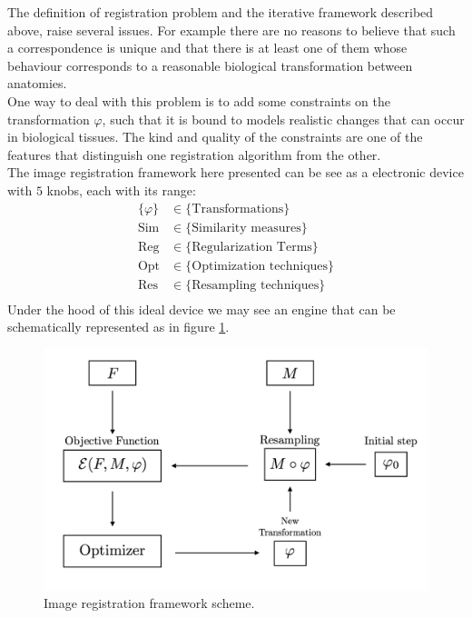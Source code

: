 The definition of registration problem and the iterative framework described above, raise several issues. For example there are no reasons to believe that such a correspondence is unique and that there is at least one of them whose behaviour corresponds to a reasonable biological transformation between anatomies.\\ 

One way to deal with this problem is to add some constraints on the transformation $\varphi$, such that it is bound to models realistic changes that can occur in biological tissues. The kind and quality of the constraints are one of the features that distinguish one registration algorithm from the other. \\
The image registration framework here presented can be see as a electronic device with $5$ knobs, each with its range:
\begin{align*}
\{  \varphi \} &\in \{ \text{Transformations}\}\\
\text{Sim} &\in \{ \text{Similarity measures}\}\\
\text{Reg} &\in \{ \text{Regularization Terms}\}\\
\text{Opt} &\in \{ \text{Optimization techniques}\}\\
\text{Res} &\in \{ \text{Resampling techniques}\}\\
\end{align*}
Under the hood of this ideal device we may see an engine that can be schematically represented as in figure \ref{fig:iterative_algorithm_scheme}.
\begin{figure}[!ht]
	\centering
	\includegraphics[scale=0.235]{figures/iterative_algorithm.png}
	\caption{Image registration framework scheme.}
	\label{fig:iterative_algorithm_scheme}
\end{figure}

